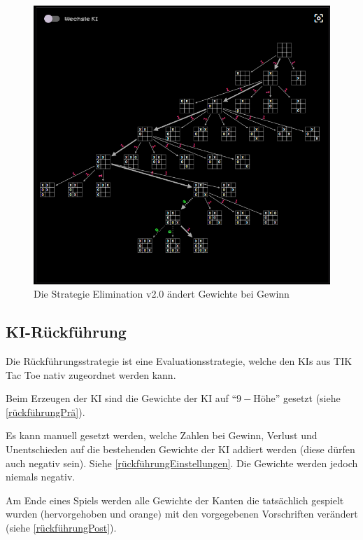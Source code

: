 \documentclass[titlepage]{scrartcl}
\newcommand{\TicTacToe}{TI\reflectbox K Tac Toe}
\begin{document}
\begin{figure}[htb]
\includegraphics[width = \linewidth]{elimination2.png}
\caption{Die Strategie Elimination v2.0 ändert Gewichte bei Gewinn}
\label{elimination2}
\end{figure}

\FloatBarrier
\newpage
\subsection{KI-Rückführung}
Die Rückführungsstrategie ist eine Evaluationsstrategie, welche den KIs aus \TicTacToe{} nativ zugeordnet werden kann.

Beim Erzeugen der KI sind die Gewichte der KI auf "`\(9-\textrm{H\"ohe}\)"' gesetzt (siehe \ref{rückführungPrä}).

Es kann manuell gesetzt werden, welche Zahlen bei Gewinn, Verlust und Unentschieden auf die bestehenden Gewichte der KI addiert werden (diese dürfen auch negativ sein).
Siehe \ref{rückführungEinstellungen}.
Die Gewichte werden jedoch niemals negativ.

Am Ende eines Spiels werden alle Gewichte der Kanten die tatsächlich gespielt wurden (hervorgehoben und orange) mit den vorgegebenen Vorschriften verändert (siehe \ref{rückführungPost}).
\end{document}
